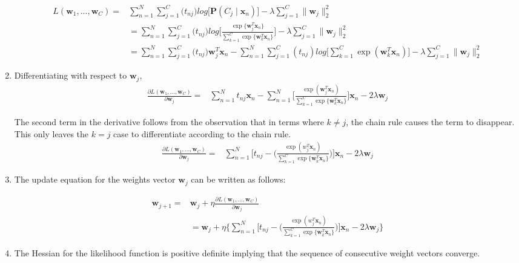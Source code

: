 \documentclass[english]{article}
\newcommand{\pr}{\mathbf{P}}
\newcommand{\vw}{\mathbf{w}}
\newcommand{\vx}{\mathbf{x}}
\begin{document}
\begin{enumerate}
\begin{align*}
L(\vw_1, ..., \vw_C)  {}={} & \sum_{n = 1}^{N}\sum_{j = 1}^{C} ({t_{nj}) log\big[{\pr(C_j \mid \vx_n)}\big]} - \lambda \sum_{j = 1}^{C} \| \vw_j\|_{2}^{2} \\
& = \sum_{n = 1}^{N}\sum_{j = 1}^{C} ({t_{nj}) log\bigg[\frac{\exp\{\vw_j^T\vx_n\}}{\sum_{k=1}^{C} \exp\{\vw_k^T\vx_n\}}\bigg]} - \lambda \sum_{j = 1}^{C} \| \vw_j\|_{2}^{2} \\
& = \sum_{n = 1}^{N}\sum_{j = 1}^{C} ({t_{nj}){\vw_j^T}{\vx_n}} -   \sum_{n = 1}^{N}\sum_{j = 1}^{C} (t_{nj})  log\bigg[ \sum_{k = 1}^{C} \exp(\vw_k^T\vx_n) \bigg] - \lambda \sum_{j = 1}^{C} \| \vw_j\|_{2}^{2} 
\end{align*}

\item Differentiating with respect to $\vw_j$,
\begin{align*}
\frac{\partial L(\vw_1, ..., \vw_C)}{\partial \vw_j}  {}={} & \sum_{n = 1}^{N}{t_{nj}{\vx_n}}  -\sum_{n = 1}^{N} \bigg[\frac{\exp({\vw_j^T}{\vx_n})}{\sum_{k=1}^{C} \exp\{\vw_k^T\vx_n\}}\bigg]{\vx_n} - 2\lambda \vw_j
\end{align*}

The second term in the derivative follows from the observation that in terms where $k \neq j$, the chain rule causes the term to disappear. This only leaves the $k = j$ case to differentiate according to the chain rule.
\begin{align*}
\frac{\partial L(\vw_1, ..., \vw_C)}{\partial \vw_j}  {}={} & \sum_{n = 1}^{N}\bigg[{t_{nj} - \bigg(\frac{\exp({w_j^T}{\vx_n})}{\sum_{k=1}^{C} \exp\{\vw_k^T\vx_n\}}\bigg)\bigg]{\vx_n}} - 2\lambda \vw_j
\end{align*}

\item The update equation for the weights vector $\vw_j$ can be written as follows:

\begin{align*}
\vw_{j+1}  {}={} & \vw_j + \eta \frac{\partial L(\vw_1, ..., \vw_C)}{\partial \vw_j} \\
& = \vw_j + \eta \bigg\{\sum_{n = 1}^{N}\bigg[{t_{nj} - \bigg(\frac{\exp({w_j^T}{\vx_n})}{\sum_{k=1}^{C} \exp\{\vw_k^T\vx_n\}}\bigg)\bigg]{\vx_n}} - 2\lambda \vw_j\bigg\}
\end{align*}

\item The Hessian for the likelihood function is positive definite implying that the sequence of consecutive weight vectors converge.

\end{enumerate}
\end{document}
